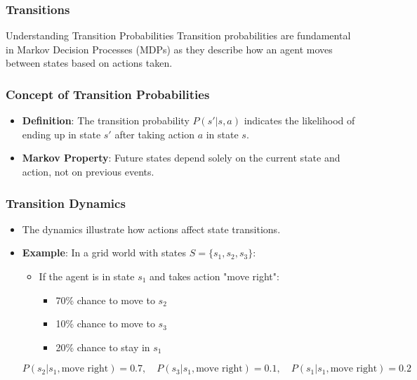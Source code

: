 \documentclass[aspectratio=169]{beamer}
\begin{document}
\begin{frame}[fragile]
    \frametitle{Transitions}
    \begin{block}{Understanding Transition Probabilities}
        Transition probabilities are fundamental in Markov Decision Processes (MDPs) as they describe how an agent moves between states based on actions taken.
    \end{block}
\end{frame}

\begin{frame}[fragile]
    \frametitle{Concept of Transition Probabilities}
    \begin{itemize}
        \item \textbf{Definition}: The transition probability \( P(s' | s, a) \) indicates the likelihood of ending up in state \( s' \) after taking action \( a \) in state \( s \).
        \item \textbf{Markov Property}: Future states depend solely on the current state and action, not on previous events.
    \end{itemize}
\end{frame}

\begin{frame}[fragile]
    \frametitle{Transition Dynamics}
    \begin{itemize}
        \item The dynamics illustrate how actions affect state transitions. 
        \item \textbf{Example}: In a grid world with states \( S = \{s_1, s_2, s_3\} \):
        \begin{itemize}
            \item If the agent is in state \( s_1 \) and takes action "move right":
            \begin{itemize}
                \item 70\% chance to move to \( s_2 \)
                \item 10\% chance to move to \( s_3 \)
                \item 20\% chance to stay in \( s_1 \)
            \end{itemize}
        \end{itemize}
        \begin{equation}
            P(s_2 | s_1, \text{move right}) = 0.7, \quad P(s_3 | s_1, \text{move right}) = 0.1, \quad P(s_1 | s_1, \text{move right}) = 0.2
        \end{equation}
    \end{itemize}
\end{frame}
\end{document}
